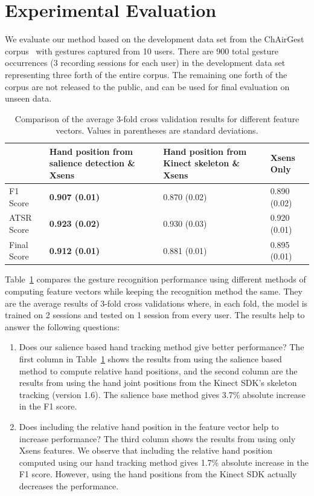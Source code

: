 \documentclass{sig-alternate-2013}
\begin{document}
\section{Experimental Evaluation}\label{sec:eval}
We evaluate our method based on the development data set from the ChAirGest
corpus~\cite{Ruffieux2013} with gestures captured from 10 users. There are 900
total gesture occurrences (3 recording sessions for each user) in the
development data set representing three forth of the entire corpus. The remaining one forth of the corpus are not released to
the public, and can be used for final evaluation on unseen data.

\begin{table}[tb]
\begin{center}
\begin{tabular}{|l|p{2cm}|p{1.7cm}|p{1.7cm}|}
\hline
 & Hand position from salience detection \& Xsens & Hand position
 from Kinect skeleton \& Xsens & Xsens Only \\
\hline
F1 Score & \textbf{0.907 (0.01)} & 0.870 (0.02) & 0.890 (0.02) \\
\hline
ATSR Score & \textbf{0.923 (0.02)} & 0.930 (0.03) & 0.920 (0.01) \\
\hline
Final Score & \textbf{0.912 (0.01)} & 0.881 (0.01) & 0.895 (0.01) \\
\hline
\end{tabular}
\caption{Comparison of the average 3-fold cross validation results for different
feature vectors. Values in parentheses are standard deviations.}
\label{tab:comp-feature}
\end{center}
\end{table}

Table~\ref{tab:comp-feature} compares the gesture recognition performance using
different methods of computing feature vectors while keeping the recognition
method the same.
They are the average results of 3-fold cross validations where, in each fold, the model is trained on 2 sessions and tested on 1 session from every user.
The results help to answer the following questions:
\begin{enumerate}
  \item Does our salience based hand tracking method give better performance?
  The first column in Table~\ref{tab:comp-feature} shows the results from
  using the salience based method to compute relative hand positions, and the
  second column are the results from using the hand joint positions from the
  Kinect SDK's skeleton tracking (version 1.6). The salience base method gives
  3.7\% absolute increase in the F1 score.
  \item Does including the relative hand position in the feature vector help to
  increase performance? The third column shows the results from using only Xsens
  features. We observe that including the relative hand position computed
  using our hand tracking method gives 1.7\% absolute increase in the F1 score.
  However, using the hand positions from the Kinect SDK actually decreases the
  performance.
\end{enumerate}
\end{document}
